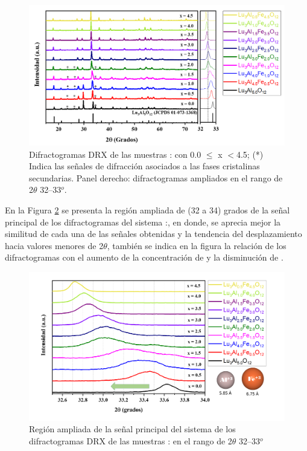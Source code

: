 \begin{figure}[h]
    \centering%

    \includegraphics[width=\textwidth]{Kap3/PatronesDRX.png}%
    \caption{Difractogramas DRX de las muestras
    : con 0.0 $\leq$ x $<$4.5; (*)
    Indica las
    señales de difracción asociados a las fases cristalinas secundarias.
    Panel
    derecho:  difractogramas ampliados en el rango de 2$\theta$ 32–33$^o$.}
    \label{fig:patDRX}
\end{figure}

En la Figura \ref{fig:DRXamp} se presenta la región ampliada de (32 a 34) grados
de la señal principal de los difractogramas del sistema
:, en donde, se aprecia mejor la similitud
de cada una de las señales obtenidas y la tendencia del desplazamiento hacia
valores menores de 2$\theta$, también se indica en la figura la relación de los
difractogramas con el aumento de la concentración de  y la
disminución de .

\begin{figure}[h]
    \centering%

    \includegraphics[width=\textwidth]{Kap3/DRXampliado.png}%
    \caption{Región ampliada de la señal principal del sistema de los
    difractogramas DRX de las muestras : en el rango
    de
    2$\theta$ 32–33$^o$} \label{fig:DRXamp}
\end{figure}

